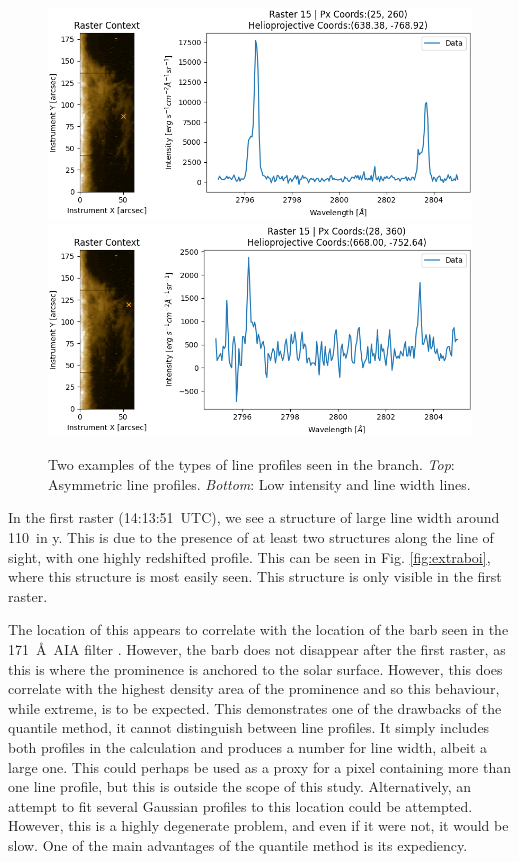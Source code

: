 \begin{figure}
    \centering
    \includegraphics[width=0.6\linewidth]{./01Observations/figs/20180419/asym1.png} 
    \includegraphics[width=0.6\linewidth]{./01Observations/figs/20180419/asym4.png}
    \caption[Two examples of the types of \mgiihk{} line profiles seen in the branch]{Two examples of the types of \mgiihk{} line profiles seen in the branch. \textit{Top}: Asymmetric line profiles. \textit{Bottom}: Low intensity and line width lines.}
    \label{asyms}
\end{figure}


In the first raster (14:13:51~UTC), we see a structure of large line width around 110\arcsec\ in y. This is due to the presence of at least two structures along the line of sight, with one highly redshifted profile. This can be seen in Fig. \ref{fig:extraboi}, where this structure is most easily seen. This structure is only visible in the first raster. 

The location of this appears to correlate with the location of the barb seen in the 171~\AA\ AIA filter . However, the barb does not disappear after the first raster, as this is where the prominence is anchored to the solar surface. However, this does correlate with the highest density area of the prominence and so this behaviour, while extreme, is to be expected. This demonstrates one of the drawbacks of the quantile method, it cannot distinguish between line profiles. It simply includes both profiles in the calculation and produces a number for line width, albeit a large one. This could perhaps be used as a proxy for a pixel containing more than one line profile, but this is outside the scope of this study. Alternatively, an attempt to fit several Gaussian profiles to this location could be attempted. However, this is a highly degenerate problem, and even if it were not, it would be slow. One of the main advantages of the quantile method is its expediency. 


